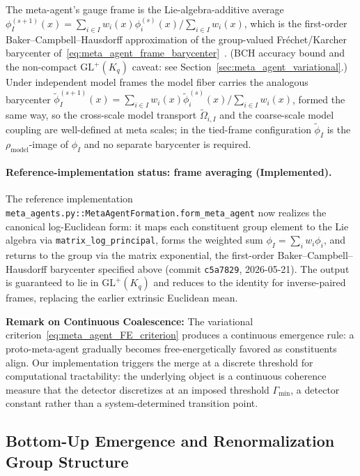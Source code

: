 \documentclass[11pt]{article}
\begin{document}
The meta-agent's gauge frame is the Lie-algebra-additive average $\phi_I^{(s+1)}(x) = \sum_{i \in I} w_i(x) \phi_i^{(s)}(x) / \sum_{i \in I} w_i(x)$, which is the first-order Baker--Campbell--Hausdorff approximation of the group-valued Fr\'echet/Karcher barycenter of~\eqref{eq:meta_agent_frame_barycenter}~\cite{Hall2015}. (BCH accuracy bound and the non-compact $\mathrm{GL}^+(K_q)$ caveat: see Section~\ref{sec:meta_agent_variational}.) Under independent model frames the model fiber carries the analogous barycenter $\tilde\phi_I^{(s+1)}(x) = \sum_{i \in I} w_i(x) \tilde\phi_i^{(s)}(x) / \sum_{i \in I} w_i(x)$, formed the same way, so the cross-scale model transport $\tilde\Omega_{i,I}$ and the coarse-scale model coupling are well-defined at meta scales; in the tied-frame configuration $\tilde\phi_I$ is the $\rho_{\mathrm{model}}$-image of $\phi_I$ and no separate barycenter is required.

\paragraph{Reference-implementation status: frame averaging (Implemented).}
The reference implementation \texttt{meta\_agents.py::MetaAgentFormation.form\_meta\_agent} now realizes the canonical log-Euclidean form: it maps each constituent group element to the Lie algebra via \texttt{matrix\_log\_principal}, forms the weighted sum $\phi_I = \sum_i w_i \phi_i$, and returns to the group via the matrix exponential, the first-order Baker--Campbell--Hausdorff barycenter specified above (commit \texttt{c5a7829}, 2026-05-21). The output is guaranteed to lie in $\mathrm{GL}^+(K_q)$ and reduces to the identity for inverse-paired frames, replacing the earlier extrinsic Euclidean mean.

\textbf{Remark on Continuous Coalescence:} The variational criterion~\eqref{eq:meta_agent_FE_criterion} produces a continuous emergence rule: a proto-meta-agent gradually becomes free-energetically favored as constituents align. Our implementation triggers the merge at a discrete threshold for computational tractability: the underlying object is a continuous coherence measure that the detector discretizes at an imposed threshold $\Gamma_{\min}$, a detector constant rather than a system-determined transition point.

\subsection{Bottom-Up Emergence and Renormalization Group Structure}
\end{document}
